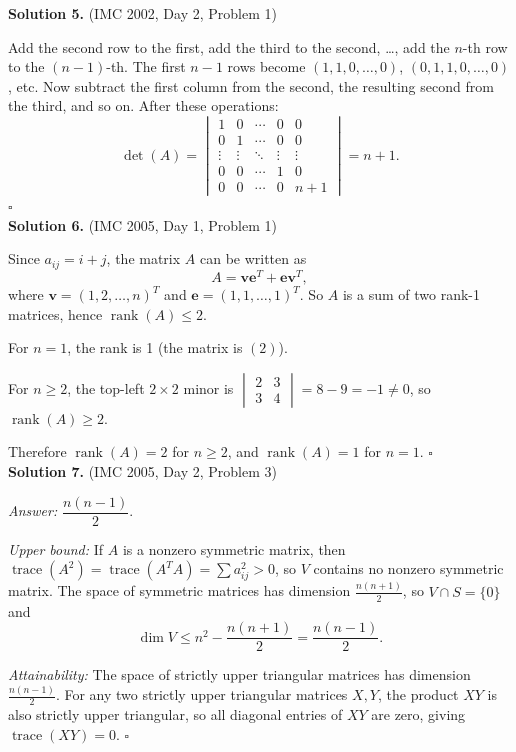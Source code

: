 \documentclass{article}
\newcommand{\tr}{\operatorname{trace}}
\begin{document}
\textbf{Solution 5.} (IMC 2002, Day 2, Problem 1)

Add the second row to the first, add the third to the second, \ldots, add the \( n \)-th row to the \( (n-1) \)-th. The first \( n - 1 \) rows become \( (1, 1, 0, \ldots, 0) \), \( (0, 1, 1, 0, \ldots, 0) \), etc. Now subtract the first column from the second, the resulting second from the third, and so on. After these operations:
\[
\det(A) = \begin{vmatrix} 1 & 0 & \cdots & 0 & 0 \\ 0 & 1 & \cdots & 0 & 0 \\ \vdots & \vdots & \ddots & \vdots & \vdots \\ 0 & 0 & \cdots & 1 & 0 \\ 0 & 0 & \cdots & 0 & n+1 \end{vmatrix} = n + 1.
\]
\hfill\(\square\)
\\

\textbf{Solution 6.} (IMC 2005, Day 1, Problem 1)

Since \( a_{ij} = i + j \), the matrix \( A \) can be written as
\[
A = \mathbf{v}\mathbf{e}^T + \mathbf{e}\mathbf{v}^T,
\]
where \( \mathbf{v} = (1, 2, \ldots, n)^T \) and \( \mathbf{e} = (1, 1, \ldots, 1)^T \). So \( A \) is a sum of two rank-1 matrices, hence \( \operatorname{rank}(A) \leq 2 \).

For \( n = 1 \), the rank is 1 (the matrix is \( (2) \)).

For \( n \geq 2 \), the top-left \( 2 \times 2 \) minor is \( \begin{vmatrix} 2 & 3 \\ 3 & 4 \end{vmatrix} = 8 - 9 = -1 \neq 0 \), so \( \operatorname{rank}(A) \geq 2 \).

Therefore \( \operatorname{rank}(A) = 2 \) for \( n \geq 2 \), and \( \operatorname{rank}(A) = 1 \) for \( n = 1 \). \hfill\(\square\)
\\

\textbf{Solution 7.} (IMC 2005, Day 2, Problem 3)

\textit{Answer:} \( \dfrac{n(n-1)}{2} \).

\textit{Upper bound:} If \( A \) is a nonzero symmetric matrix, then \( \tr(A^2) = \tr(A^T A) = \sum a_{ij}^2 > 0 \), so \( V \) contains no nonzero symmetric matrix. The space of symmetric matrices has dimension \( \frac{n(n+1)}{2} \), so \( V \cap S = \{0\} \) and
\[
\dim V \leq n^2 - \frac{n(n+1)}{2} = \frac{n(n-1)}{2}.
\]

\textit{Attainability:} The space of strictly upper triangular matrices has dimension \( \frac{n(n-1)}{2} \). For any two strictly upper triangular matrices \( X, Y \), the product \( XY \) is also strictly upper triangular, so all diagonal entries of \( XY \) are zero, giving \( \tr(XY) = 0 \). \hfill\(\square\)
\\
\end{document}
